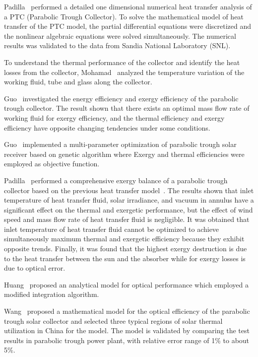 Padilla~\cite{Padilla2011} performed a detailed one dimensional numerical heat transfer analysis of a PTC (Parabolic Trough Collector). To solve the mathematical model of heat transfer of the PTC model, the partial differential equations were discretized and the nonlinear algebraic equations were solved simultaneously. The numerical results was validated to the data from Sandia National Laboratory (SNL).

To understand the thermal performance of the collector and identify the heat losses from the collector, Mohamad~\cite{Mohamad2014} analyzed the temperature variation of the working fluid, tube and glass along the collector.

Guo~\cite{JiangfengGuo2016-1} investigated the energy efficiency and exergy efficiency of the parabolic trough collector. The result shown that there exists an optimal mass flow rate of working fluid for exergy efficiency, and the thermal efficiency and exergy efficiency have opposite changing tendencies under some conditions.

Guo~\cite{JiangfengGuo2016-2} implemented a multi-parameter optimization of parabolic trough solar receiver based on genetic algorithm where Exergy and thermal efficiencies were employed as objective function.

Padilla~\cite{Padilla2014} performed a comprehensive exergy balance of a parabolic trough collector based on the previous heat transfer model~\cite{Padilla2011}. The results shown that inlet temperature of heat transfer fluid, solar irradiance, and vacuum in annulus have a significant effect on the thermal and exergetic performance, but the effect of wind speed and mass flow rate of heat transfer fluid is negligible. It was obtained that inlet temperature of heat transfer fluid cannot be optimized to achieve simultaneously maximum thermal and exergetic efficiency because they exhibit opposite trends. Finally, it was found that the highest exergy destruction is due to the heat transfer between the sun and the absorber while for exergy losses is due to optical error.

Huang~\cite{Huang2012} proposed an analytical model for optical performance which employed a modified integration algorithm.

Wang~\cite{Wang2016} proposed a mathematical model for the optical efficiency of the parabolic trough solar collector and selected three typical regions of solar thermal utilization in China for the model. The model is validated by comparing the test results in parabolic trough power plant, with relative error range of 1\% to about 5\%.

